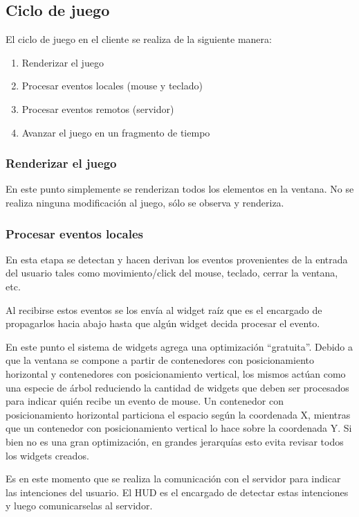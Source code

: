 \documentclass[titlepage,a4paper,12pt]{article}
\begin{document}
\subsection{Ciclo de juego}
El ciclo de juego en el cliente se realiza de la siguiente manera:
\begin{enumerate}
    \item Renderizar el juego
    \item Procesar eventos locales (mouse y teclado)
    \item Procesar eventos remotos (servidor)
    \item Avanzar el juego en un fragmento de tiempo
\end{enumerate}

\subsubsection{Renderizar el juego}
En este punto simplemente se renderizan todos los elementos en la ventana. No se realiza ninguna modificación al juego, sólo se observa y renderiza.

\subsubsection{Procesar eventos locales}
En esta etapa se detectan y hacen derivan los eventos provenientes de la entrada del usuario tales como movimiento/click del mouse, teclado, cerrar la ventana, etc.

Al recibirse estos eventos se los envía al widget raíz que es el encargado de propagarlos hacia abajo hasta que algún widget decida procesar el evento.

En este punto el sistema de widgets agrega una optimización ``gratuita''. Debido a que la ventana se compone a partir de contenedores con posicionamiento horizontal y contenedores con posicionamiento vertical, los mismos actúan como una especie de árbol reduciendo la cantidad de widgets que deben ser procesados para indicar quién recibe un evento de mouse. 
Un contenedor con posicionamiento horizontal particiona el espacio según la coordenada X, mientras que un contenedor con posicionamiento vertical lo hace sobre la coordenada Y. Si bien no es una gran optimización, en grandes jerarquías esto evita revisar todos los widgets creados.

Es en este momento que se realiza la comunicación con el servidor para indicar las intenciones del usuario. El HUD es el encargado de detectar estas intenciones y luego comunicarselas al servidor.
\end{document}
